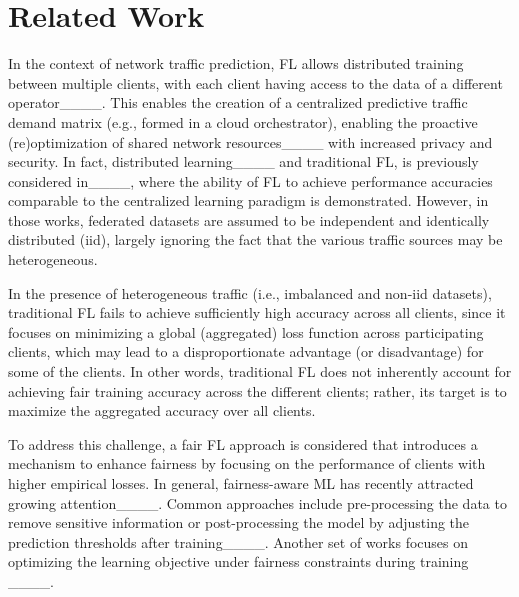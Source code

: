 \section{Related Work}
In the context of network traffic prediction, FL allows distributed training between multiple clients, with each client having access to the data of a different operator____. This enables the creation of a centralized predictive traffic demand matrix (e.g., formed in a cloud orchestrator), enabling the proactive (re)optimization of shared network resources____ with increased privacy and security. In fact, distributed learning____ and traditional FL, is previously considered in____, where the ability of FL to achieve performance accuracies comparable to the centralized learning paradigm is demonstrated. However, in those works, federated datasets are assumed to be independent and identically distributed (iid), largely ignoring the fact that the various traffic sources may be heterogeneous.%

In the presence of heterogeneous traffic (i.e., imbalanced and non-iid datasets), traditional FL fails to achieve sufficiently high accuracy across all clients, since it focuses on minimizing a global (aggregated) loss function across participating clients, which may lead to a disproportionate advantage (or disadvantage) for some of the clients. In other words, traditional FL does not inherently account for achieving fair training accuracy across the different clients; rather, its target is to maximize the aggregated accuracy over all clients.


To address this challenge, a fair FL approach is considered that introduces a mechanism to enhance fairness by focusing on the performance of clients with higher empirical losses. In general, fairness-aware ML has recently attracted growing attention____. Common approaches include pre-processing the data to remove sensitive information or post-processing the model by adjusting the prediction thresholds after training____. Another set of works focuses on optimizing the learning objective under fairness constraints during training ____. 

